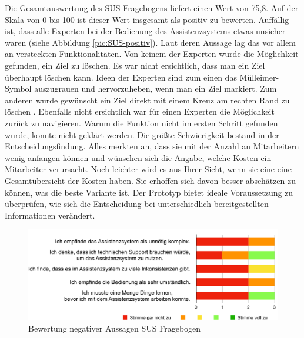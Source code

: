 Die Gesamtauswertung des SUS Fragebogens liefert einen Wert von 75,8. Auf der Skala von 0 bis 100 ist dieser Wert insgesamt als positiv zu bewerten.  Auffällig ist, dass alle Experten bei der Bedienung des Assistenzsystems etwas unsicher waren (siehe Abbildung \ref{pic:SUS-positiv}). Laut deren Aussage lag das vor allem an versteckten Funktionalitäten. Von keinem der Experten wurde die Möglichkeit gefunden, ein Ziel zu löschen. Es war nicht ersichtlich, dass man ein Ziel überhaupt löschen kann. Ideen der Experten sind zum einen das Mülleimer-Symbol auszugrauen und hervorzuheben, wenn man ein Ziel markiert. Zum anderen wurde gewünscht ein Ziel direkt mit einem Kreuz am rechten Rand zu löschen . Ebenfalls nicht ersichtlich war für einen Experten die Möglichkeit zurück zu navigieren. Warum die Funktion nicht im ersten Schritt gefunden wurde, konnte nicht geklärt werden. Die größte Schwierigkeit bestand in der Entscheidungsfindung. Alles merkten an, dass sie mit der Anzahl an Mitarbeitern wenig anfangen können und wünschen sich die Angabe, welche Kosten ein Mitarbeiter verursacht. Noch leichter wird es aus Ihrer Sicht, wenn sie eine eine Gesamtübersicht der Kosten haben. Sie erhoffen sich davon besser abschätzen zu können, was die beste Variante ist. Der Prototyp bietet ideale Voraussetzung zu überprüfen, wie sich die Entscheidung bei unterschiedlich bereitgestellten Informationen verändert.
\begin{figure}[htb]
\centering
\includegraphics[scale=0.65]{DA_files/Bilder/Validierung/Bild-negative_Aussagen.pdf}
\caption{Bewertung negativer Aussagen SUS Fragebogen}
\label{pic:SUS-negativ}
\end{figure}

